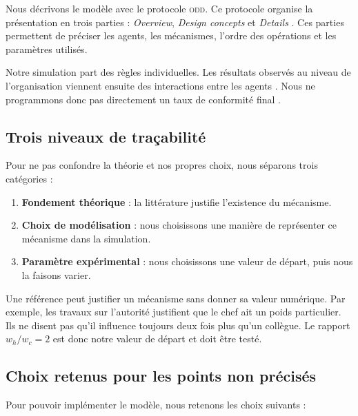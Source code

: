 \documentclass[11pt,a4paper]{article}
\newcommand{\ODD}{\textsc{odd}}
\begin{document}
Nous décrivons le modèle avec le protocole \ODD{}. Ce protocole organise la
présentation en trois parties : \emph{Overview}, \emph{Design concepts} et
\emph{Details} \cite{grimm2020}. Ces parties permettent de préciser les agents,
les mécanismes, l’ordre des opérations et les paramètres utilisés.

Notre simulation part des règles individuelles. Les résultats observés au
niveau de l’organisation viennent ensuite des interactions entre les agents
\cite{epstein1996}. Nous ne programmons donc pas directement un taux de
conformité final \cite{gilbert2005}.

\subsection{Trois niveaux de traçabilité}

Pour ne pas confondre la théorie et nos propres choix, nous séparons trois
catégories :

\begin{enumerate}
  \item \textbf{Fondement théorique} : la littérature justifie l’existence du
  mécanisme.
  \item \textbf{Choix de modélisation} : nous choisissons une manière de
  représenter ce mécanisme dans la simulation.
  \item \textbf{Paramètre expérimental} : nous choisissons une valeur de départ,
  puis nous la faisons varier.
\end{enumerate}

\begin{warningbox}[title=Règle d’interprétation]
Une référence peut justifier un mécanisme sans donner sa valeur numérique. Par
exemple, les travaux sur l’autorité justifient que le chef ait un poids
particulier. Ils ne disent pas qu’il influence toujours deux fois plus qu’un
collègue. Le rapport $w_h/w_c=2$ est donc notre valeur de départ et doit être
testé.
\end{warningbox}

\subsection{Choix retenus pour les points non précisés}

Pour pouvoir implémenter le modèle, nous retenons les choix suivants :
\end{document}
